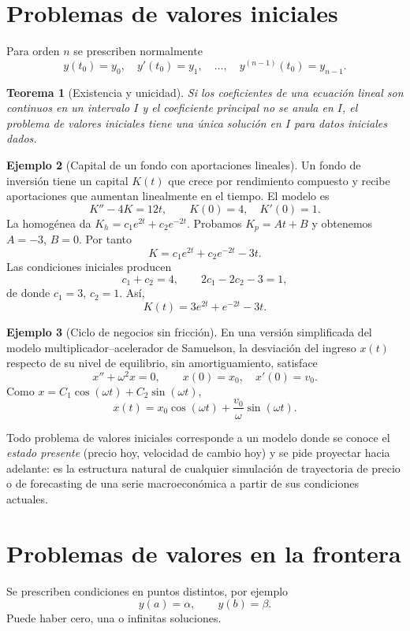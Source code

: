 \documentclass[11pt]{article}
\newtheorem{teorema}{Teorema}[section]
\theoremstyle{definition}
\newtheorem{ejemplo}[teorema]{Ejemplo}
\begin{document}
\section{Problemas de valores iniciales}
Para orden $n$ se prescriben normalmente
\[
y(t_0)=y_0,\quad y'(t_0)=y_1,\quad\ldots,\quad y^{(n-1)}(t_0)=y_{n-1}.
\]

\begin{teorema}[Existencia y unicidad]
Si los coeficientes de una ecuación lineal son continuos en un intervalo $I$ y el
coeficiente principal no se anula en $I$, el problema de valores iniciales tiene una
única solución en $I$ para datos iniciales dados.
\end{teorema}

\begin{ejemplo}[Capital de un fondo con aportaciones lineales]
Un fondo de inversión tiene un capital $K(t)$ que crece por rendimiento compuesto y
recibe aportaciones que aumentan linealmente en el tiempo. El modelo es
\[
K''-4K=12t,\qquad K(0)=4,\quad K'(0)=1.
\]
La homogénea da $K_h=c_1e^{2t}+c_2e^{-2t}$. Probamos $K_p=At+B$ y obtenemos
$A=-3$, $B=0$. Por tanto
\[
K=c_1e^{2t}+c_2e^{-2t}-3t.
\]
Las condiciones iniciales producen
\[
c_1+c_2=4,\qquad 2c_1-2c_2-3=1,
\]
de donde $c_1=3$, $c_2=1$. Así,
\[
\boxed{K(t)=3e^{2t}+e^{-2t}-3t}.
\]
\end{ejemplo}

\begin{ejemplo}[Ciclo de negocios sin fricción]
En una versión simplificada del modelo multiplicador--acelerador de Samuelson, la
desviación del ingreso $x(t)$ respecto de su nivel de equilibrio, sin amortiguamiento,
satisface
\[
x''+\omega^2x=0,\qquad x(0)=x_0,\quad x'(0)=v_0.
\]
Como $x=C_1\cos(\omega t)+C_2\sin(\omega t)$,
\[
\boxed{x(t)=x_0\cos(\omega t)+\frac{v_0}{\omega}\sin(\omega t)}.
\]
\end{ejemplo}

\begin{finanzas}
Todo problema de valores iniciales corresponde a un modelo donde se conoce el
\emph{estado presente} (precio hoy, velocidad de cambio hoy) y se pide proyectar hacia
adelante: es la estructura natural de cualquier simulación de trayectoria de precio o
de forecasting de una serie macroeconómica a partir de sus condiciones actuales.
\end{finanzas}

\section{Problemas de valores en la frontera}
Se prescriben condiciones en puntos distintos, por ejemplo
\[
y(a)=\alpha,\qquad y(b)=\beta.
\]
Puede haber cero, una o infinitas soluciones.
\end{document}
